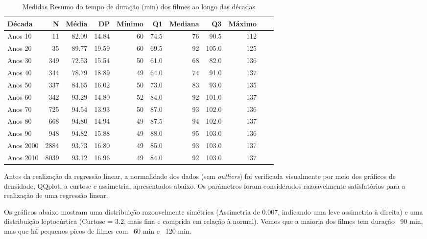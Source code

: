 \documentclass[a4paper, 12pt]{article} %
\begin{document}
\begin{table}[H]
\caption{Medidas Resumo do tempo de duração (min) dos filmes ao longo das décadas}
\centering
\begin{tabular}{l|rrrrrrrrrr}
\hline
\multicolumn{1}{l|}{\textbf{Década}} &
\multicolumn{1}{r}{\textbf{N}} &
\multicolumn{1}{r}{\textbf{Média}} &
\multicolumn{1}{r}{\textbf{DP}}&
\multicolumn{1}{r}{\textbf{Mínimo}}&
\multicolumn{1}{r}{\textbf{Q1}}&
\multicolumn{1}{r}{\textbf{Mediana}}&
\multicolumn{1}{r}{\textbf{Q3}}&
\multicolumn{1}{r}{\textbf{Máximo}}\\
\hline
Anos 10 & 11  & 82.09 & 14.84 & 60 & 74.5 & 76 & 90.5 & 112\\
Anos 20 & 35  & 89.77 & 19.59 & 60 & 69.5 & 92 & 105.0 & 125\\
Anos 30 & 349  & 72.53 & 15.54 & 50 & 61.0 & 68 & 82.0 & 136\\
Anos 40 & 344  & 78.79 & 18.89 & 49 & 64.0 & 74 & 91.0 & 137\\
Anos 50 & 337  & 84.65 & 16.02 & 50 & 73.0 & 83 & 93.0 & 135\\
Anos 60 & 342 & 93.29 & 14.80 & 52 & 84.0 & 92 & 101.0 & 137\\
Anos 70 & 725  & 94.54 & 13.93 & 50 & 87.0 & 93 & 102.0 & 136\\
Anos 80 & 668  & 94.80 & 14.94 & 49 & 87.5 & 94 & 102.0 & 137\\
Anos 90 & 948  & 94.82 & 15.88 & 49 & 88.0 & 95 & 103.0 & 136\\
Anos 2000 & 2884  & 93.73 & 16.80 & 49 & 85.0 & 93 & 103.0 & 137\\
Anos 2010 & 8039  & 93.12 & 16.96 & 49 & 84.0 & 92 & 103.0 & 137\\
\hline
\end{tabular}
\end{table}

Antes da realização da regressão linear, a normalidade dos dados (sem \emph{outliers}) foi verificada visualmente por meio dos gráficos de densidade, QQplot, a curtose e assimetria, apresentados abaixo. Os parâmetros foram considerados razoavelmente satisfatórios para a realização de uma regressão linear. 

Os gráficos abaixo mostram uma distribuição razoavelmente simétrica (Assimetria de 0.007, indicando uma leve assimetria à direita) e uma distribuição leptocúrtica (Curtose = 3.2, mais fina e comprida em relação à normal). Vemos que a maioria dos filmes tem duração ~90 min, mas que há pequenos picos de filmes com ~60 min e ~120 min.
\end{document}

